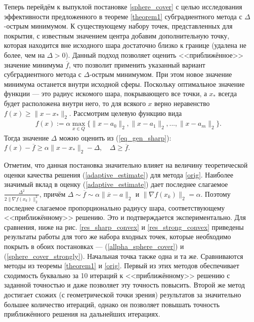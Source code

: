     Теперь перейдём к выпуклой постановке \eqref{sphere_cover} с целью исследования эффективности предложенного в теореме \ref{theorem1} субградиентного метода с $\Delta$-острым минимумом. К существующему набору точек, представленных для покрытия, с известным значением центра добавим дополнительную точку, которая находится вне исходного шара достаточно близко к границе (удалена не более, чем на $\Delta > 0$). Данный подход позволяет оценить <<приближённое>> значение минимума $\overline{f}$, что позволит применить указанный вариант субградиентного метода с $\Delta$-острым минимумом. При этом новое значение минимума останется внутри исходной сферы. Поскольку оптимальное значение функции --- это радиус искомого шара, покрывающего все точки, а $x_*$ всегда будет расположена внутри него, то для всякого $x$ верно неравенство $ f(x) \geq \| x - x_*\|_2$. Рассмотрим целевую функцию вида
    \begin{gather}\label{allpha_sphere_cover}
        f(x) := \alpha \max_{x\in Q}\{\|x - a_0\|_2, \|x - a_1\|_2, ..., \|x - a_m\|_2\}.
    \end{gather}
    Тогда значение $\Delta$ можно оценить  из (\ref{eq_gen_sharp}): 
        $f(x) - \overline{f} \geq \alpha\|x- x_*\|_2 - \Delta, \quad \Delta \geq \overline{f}$.

    Отметим, что данная постановка значительно влияет на величину теоретической оценки качества решения (\ref{adaptive_estimate}) для метода \eqref{orig}.
    Наиболее значимый вклад в оценку (\ref{adaptive_estimate}) дает последнее слагаемое $\frac{\Delta^2}{2\|\nabla f(x_k)\|^2_2}$, причём 
    $     \Delta \sim \overline{f} \sim \alpha \|\overline{x}-a\|_2 $ и 
    $     \|\nabla f(x_k)\|_2 = \alpha $. Поэтому последнее слагаемое пропорционально радиусу шара, соответствующему <<приближённому>> решению. Это и подтверждается экспериментально. Для сравнения, ниже на рис. \ref{res_sharp_convex} и \ref{res_strong_convex} приведены результаты работы для того же набора входных точек, которые необходимо покрыть в обоих постановках --- (\ref{allpha_sphere_cover}) и (\ref{sphere_cover_strongly}). Начальная точка также одна и та же. Сравниваются методы из теоремы \ref{theorem1} и \eqref{orig}. Первый из этих методов обеспечивает сходимость буквально за 10 итераций к <<приближённому>> решению с заданной точностью и даже позволяет эту точность повысить. Второй же метод достигает схожих (с геометрической точки зрения) результатов за значительно большее количество итераций, однако он позволяет повышать точность приближённого решения на дальнейших итерациях.

